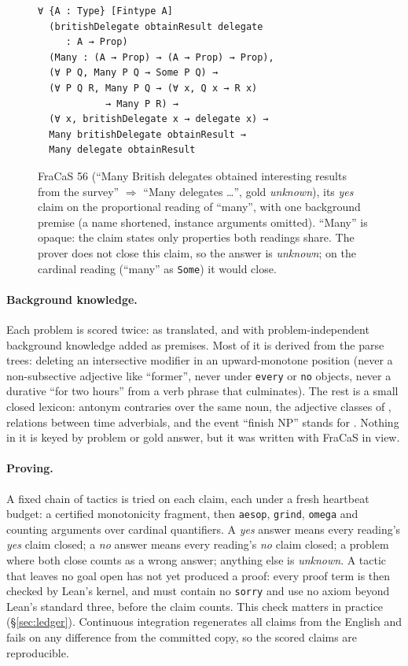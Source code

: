 \documentclass[11pt]{article}
\newcommand{\yes}{\textit{yes}}
\newcommand{\no}{\textit{no}}
\newcommand{\unk}{\textit{unknown}}
\newcommand{\nm}[1]{\texttt{#1}}
\begin{document}
\begin{figure}[t]
\small
\begin{verbatim}
∀ {A : Type} [Fintype A]
  (britishDelegate obtainResult delegate
     : A → Prop)
  (Many : (A → Prop) → (A → Prop) → Prop),
  (∀ P Q, Many P Q → Some P Q) →
  (∀ P Q R, Many P Q → (∀ x, Q x → R x)
            → Many P R) →
  (∀ x, britishDelegate x → delegate x) →
  Many britishDelegate obtainResult →
  Many delegate obtainResult
\end{verbatim}
\caption{FraCaS 56 (``Many British delegates obtained interesting
results from the survey'' $\Rightarrow$ ``Many delegates \ldots'', gold
\unk{}), its \yes{} claim on the proportional reading of ``many'', with
one background premise (a name shortened, instance arguments omitted). ``Many'' is opaque:
the claim states only properties both readings share. The prover does
not close this claim, so the answer is \unk{}; on the cardinal reading
(``many'' as \nm{Some}) it would close.}
\label{fig:claim}
\end{figure}

\paragraph{Background knowledge.} Each problem is scored twice: as
translated, and with problem-independent background knowledge added as
premises. Most of it is derived from the parse trees: deleting an
intersective modifier in an upward-monotone position (never a
non-subsective adjective like ``former'', never under \nm{every} or
\nm{no} objects, never a durative ``for two hours'' from a verb phrase
that culminates). The rest is a small closed lexicon: antonym contraries
over the same noun, the adjective classes of
\citet{kamp-partee-1995-prototype}, relations between time adverbials,
and the event ``finish NP'' stands for \citep{pustejovsky-1995-generative}.
Nothing in it is keyed by problem or gold answer, but it was written
with FraCaS in view.

\paragraph{Proving.} A fixed chain of tactics is tried on each claim,
each under a fresh heartbeat budget: a certified monotonicity
fragment, then \nm{aesop}, \nm{grind}, \nm{omega} and counting
arguments over cardinal quantifiers. A \yes{} answer means every
reading's \yes{} claim closed; a \no{} answer means every reading's
\no{} claim closed; a problem where both close counts as a wrong answer;
anything else is \unk{}. A tactic that leaves no goal open has not
yet produced a proof: every proof term is then checked by Lean's
kernel, and must contain no \nm{sorry} and use no axiom beyond Lean's
standard three, before the claim counts. This check matters in
practice (\S\ref{sec:ledger}). Continuous integration regenerates all claims from the English and fails
on any difference from the committed copy, so the scored claims are
reproducible.
\end{document}

